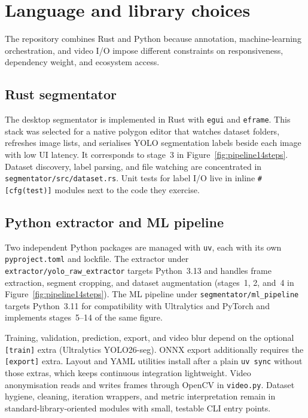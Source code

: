 \section{Language and library choices}
\label{sec:languages}

The repository combines Rust and Python because annotation, machine-learning orchestration, and video I/O impose different constraints on responsiveness, dependency weight, and ecosystem access.

\subsection{Rust segmentator}

The desktop segmentator is implemented in Rust with \texttt{egui} and \texttt{eframe}. This stack was selected for a native polygon editor that watches dataset folders, refreshes image lists, and serialises YOLO segmentation labels beside each image with low UI latency. It corresponds to stage~3 in Figure~\ref{fig:pipeline14steps}. Dataset discovery, label parsing, and file watching are concentrated in \texttt{segmentator/src/dataset.rs}. Unit tests for label I/O live in inline \texttt{\#[cfg(test)]} modules next to the code they exercise.

\subsection{Python extractor and ML pipeline}

Two independent Python packages are managed with \texttt{uv}, each with its own \texttt{pyproject.toml} and lockfile. The extractor under \texttt{extractor/yolo\_raw\_extractor} targets Python~3.13 and handles frame extraction, segment cropping, and dataset augmentation (stages~1, 2, and~4 in Figure~\ref{fig:pipeline14steps}). The ML pipeline under \texttt{segmentator/ml\_pipeline} targets Python~3.11 for compatibility with Ultralytics and PyTorch and implements stages~5--14 of the same figure.

Training, validation, prediction, export, and video blur depend on the optional \texttt{[train]} extra (Ultralytics YOLO26-seg). ONNX export additionally requires the \texttt{[export]} extra. Layout and YAML utilities install after a plain \texttt{uv sync} without those extras, which keeps continuous integration lightweight. Video anonymisation reads and writes frames through OpenCV in \texttt{video.py}. Dataset hygiene, cleaning, iteration wrappers, and metric interpretation remain in standard-library-oriented modules with small, testable CLI entry points.

